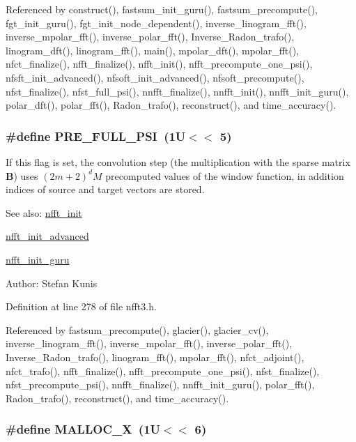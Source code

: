 Referenced by construct(), fastsum\_\-init\_\-guru(), fastsum\_\-precompute(), fgt\_\-init\_\-guru(), fgt\_\-init\_\-node\_\-dependent(), inverse\_\-linogram\_\-fft(), inverse\_\-mpolar\_\-fft(), inverse\_\-polar\_\-fft(), Inverse\_\-Radon\_\-trafo(), linogram\_\-dft(), linogram\_\-fft(), main(), mpolar\_\-dft(), mpolar\_\-fft(), nfct\_\-finalize(), nfft\_\-finalize(), nfft\_\-init(), nfft\_\-precompute\_\-one\_\-psi(), nfsft\_\-init\_\-advanced(), nfsoft\_\-init\_\-advanced(), nfsoft\_\-precompute(), nfst\_\-finalize(), nfst\_\-full\_\-psi(), nnfft\_\-finalize(), nnfft\_\-init(), nnfft\_\-init\_\-guru(), polar\_\-dft(), polar\_\-fft(), Radon\_\-trafo(), reconstruct(), and time\_\-accuracy().\hypertarget{group__nfft_g7ad8a7e19519b16340dabec48899c6a4}{
\subsubsection{\setlength{\rightskip}{0pt plus 5cm}\#define PRE\_\-FULL\_\-PSI~(1U$<$$<$ 5)}}
\label{group__nfft_g7ad8a7e19519b16340dabec48899c6a4}


If this flag is set, the convolution step (the multiplication with the sparse matrix $\mathbf{B}$) uses $(2m+2)^dM$ precomputed values of the window function, in addition indices of source and target vectors are stored. 

\begin{Desc}
\item[See also:]\hyperlink{group__nfft_g1dfeaf18f3735f035afa62ca768d99c4}{nfft\_\-init} 

\hyperlink{group__nfft_gcd4a22fd1f6ea476a57759a90510d114}{nfft\_\-init\_\-advanced} 

\hyperlink{group__nfft_g406f05717c6299b918261c61aaa9de23}{nfft\_\-init\_\-guru} \end{Desc}
\begin{Desc}
\item[Author:]Stefan Kunis \end{Desc}


Definition at line 278 of file nfft3.h.

Referenced by fastsum\_\-precompute(), glacier(), glacier\_\-cv(), inverse\_\-linogram\_\-fft(), inverse\_\-mpolar\_\-fft(), inverse\_\-polar\_\-fft(), Inverse\_\-Radon\_\-trafo(), linogram\_\-fft(), mpolar\_\-fft(), nfct\_\-adjoint(), nfct\_\-trafo(), nfft\_\-finalize(), nfft\_\-precompute\_\-one\_\-psi(), nfst\_\-finalize(), nfst\_\-precompute\_\-psi(), nnfft\_\-finalize(), nnfft\_\-init\_\-guru(), polar\_\-fft(), Radon\_\-trafo(), reconstruct(), and time\_\-accuracy().\hypertarget{group__nfft_g353185384f87de0dc4320a82652ef724}{
\subsubsection{\setlength{\rightskip}{0pt plus 5cm}\#define MALLOC\_\-X~(1U$<$$<$ 6)}}
\label{group__nfft_g353185384f87de0dc4320a82652ef724}


